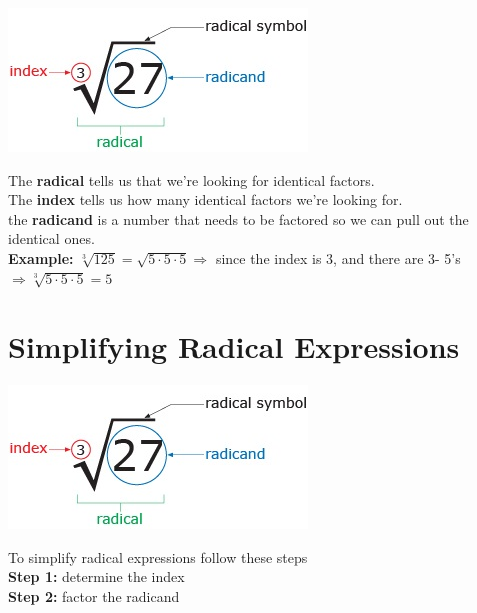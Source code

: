 \documentclass[12pt]{article}
\begin{document}
\begin{center}
\includegraphics[scale=.7]{radical.jpg}
\end{center}



The \textbf{radical} tells us that we're looking for identical factors.\\

The \textbf{index} tells us how many identical factors we're looking for.\\

the \textbf{radicand} is a number that needs to be factored so we can pull out the identical ones.\\

\textbf{Example:} $\sqrt[3]{125}=\sqrt{5\cdot5\cdot 5} \Longrightarrow$ since the index is 3, and there are 3- 5's $\Longrightarrow \sqrt[3]{5\cdot5\cdot5}=5$\\

\pagebreak

\section{Simplifying Radical Expressions}

\begin{center}
\includegraphics[scale=.7]{radical.jpg}\\
\end{center}

To simplify radical expressions follow these steps\\

\textbf{Step 1:} determine the index\\

\textbf{Step 2:} factor the radicand\\
\end{document}
